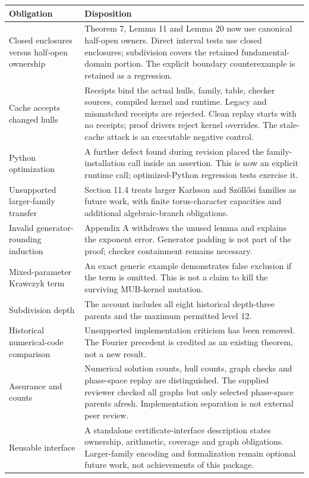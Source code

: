 \documentclass[
  11pt,
]{article}
\newcounter{none} %
\begin{document}
{\def\LTcaptype{none} %
\begin{longtable}[]{@{}
  >{\raggedright\arraybackslash}p{}
  >{\raggedright\arraybackslash}p{}@{}}
\toprule\noalign{}
\begin{minipage}[b]{\linewidth}\raggedright
Obligation
\end{minipage} & \begin{minipage}[b]{\linewidth}\raggedright
Disposition
\end{minipage} \\
\midrule\noalign{}
\endhead
\bottomrule\noalign{}
\endlastfoot
Closed enclosures versus half-open ownership & Theorem 7, Lemma 11 and
Lemma 20 now use canonical half-open owners. Direct interval tests use
closed enclosures; subdivision covers the retained fundamental-domain
portion. The explicit boundary counterexample is retained as a
regression. \\
Cache accepts changed hulls & Receipts bind the actual hulls, family,
table, checker sources, compiled kernel and runtime. Legacy and
mismatched receipts are rejected. Clean replay starts with no receipts;
proof drivers reject kernel overrides. The stale-cache attack is an
executable negative control. \\
Python optimization & A further defect found during revision placed the
family-installation call inside an assertion. This is now an explicit
runtime call; optimized-Python regression tests exercise it. \\
Unsupported larger-family transfer & Section 11.4 treats larger Karlsson
and Szöllősi families as future work, with finite torus-character
capacities and additional algebraic-branch obligations. \\
Invalid generator-rounding induction & Appendix A withdraws the unused
lemma and explains the exponent error. Generator padding is not part of
the proof; checker containment remains necessary. \\
Mixed-parameter Krawczyk term & An exact generic example demonstrates
false exclusion if the term is omitted. This is not a claim to kill the
surviving MUB-kernel mutation. \\
Subdivision depth & The account includes all eight historical
depth-three parents and the maximum permitted level 12. \\
Historical numerical-code comparison & Unsupported implementation
criticism has been removed. The Fourier precedent is credited as an
existing theorem, not a new result. \\
Assurance and counts & Numerical solution counts, hull counts, graph
checks and phase-space replay are distinguished. The supplied reviewer
checked all graphs but only selected phase-space parents afresh.
Implementation separation is not external peer review. \\
Reusable interface & A standalone certificate-interface description
states ownership, arithmetic, coverage and graph obligations.
Larger-family encoding and formalization remain optional future work,
not achievements of this package. \\
\end{longtable}
}
\end{document}
